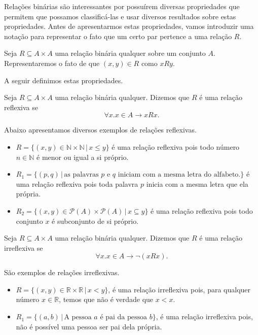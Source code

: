Relações binárias são interessantes por possuírem diversas
propriedades que permitem que possamos classificá-las e usar diversos
resultados sobre estas propriedades. Antes de apresentarmos estas propriedades,
vamos introduzir uma notação para representar o fato que um certo par
pertence a uma relação $R$.
\begin{Notation}
Seja $R\subseteq A \times A$ uma relação binária qualquer sobre um
conjunto $A$. Representaremos o fato de que $(x,y) \in R$ como $xRy$.
\end{Notation}
A seguir definimos estas propriedades.

\begin{Definition}
Seja $R\subseteq A \times A$ uma relação binária qualquer. Dizemos que
$R$ é uma relação reflexiva se
\[
\forall x. x\in A \to  xRx.
\]
\end{Definition}

\begin{Example}
Abaixo apresentamos diversos exemplos de relações reflexivas.
\begin{itemize}
  \item $R = \{(x,y) \in \mathbb{N} \times \mathbb{N}\,|\, x \leq
    y\}$ é uma relação reflexiva pois todo número $n\in\mathbb{N}$ é
    menor ou igual a si próprio.
  \item $R_1 = \{(p,q)\,|\,\text{as palavras $p$ e $q$ iniciam com a
      mesma letra do alfabeto.}\}$ é uma relação reflexiva pois toda
    palavra $p$ inicia com a mesma letra que ela própria.
  \item $R_2=\{(x,y)\in\mathcal{P}(A)\times\mathcal{P}(A)\,|\,x
    \subseteq y\}$ é uma relação reflexiva pois todo conjunto $x$ é
    subconjunto de si próprio.
\end{itemize}
\end{Example}

\begin{Definition}
Seja $R\subseteq A \times A$ uma relação binária qualquer. Dizemos que
$R$ é uma relação irreflexiva se
\[
\forall x. x\in A \to  \neg (xRx).
\]
\end{Definition}

\begin{Example}
São exemplos de relações irreflexivas.
\begin{itemize}
  \item $R = \{(x,y)\in\mathbb{R}\times \mathbb{R}\,|\, x < y\}$, é
    uma relação irreflexiva pois, para qualquer número $x \in
    \mathbb{R}$, temos que não é verdade que $x < x$.
  \item $R_1 =\{(a,b) \,|\, \text{A pessoa $a$ é pai da pessoa
      $b$}\}$, é uma relação irreflexiva pois, não é possível uma
    pessoa ser pai dela própria.
\end{itemize}
\end{Example}

